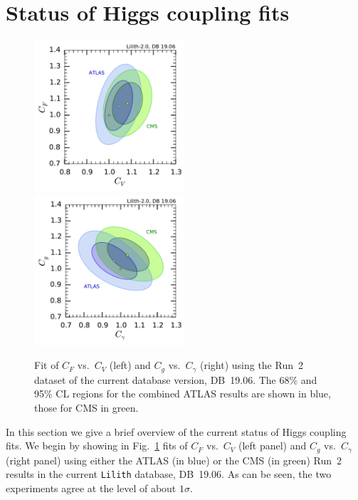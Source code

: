 \section{Status of Higgs coupling fits}

\begin{figure}[b!]\centering
\includegraphics[width=0.5\textwidth]{fits/CVCF_2d_ATLAS_CMS.pdf}%
\includegraphics[width=0.5\textwidth]{fits/CgCGa_2d_ATLAS_CMS.pdf}%
\vspace*{-2mm}
\caption{Fit of $C_F$ vs.\ $C_V$ (left) and $C_g$ vs.\ $C_\gamma$ (right) using the Run~2 dataset of the 
current database version, DB~19.06. The 68\% and 95\% CL regions for the combined ATLAS results 
are shown in blue, those for CMS in green.}
\label{fig:rcfit-ATLAS-CMS}
\end{figure}

In this section we give a brief overview of the current status of Higgs coupling fits.   
We begin by showing in Fig.~\ref{fig:rcfit-ATLAS-CMS} fits of  $C_F$ vs.\ $C_V$ (left panel) and 
$C_g$ vs.\ $C_\gamma$ (right panel) using either the ATLAS (in blue) or the CMS (in green) 
Run~2 results in the current {\tt Lilith} database, DB~19.06. 
As can be seen, the two experiments agree at the level of about $1\sigma$. 

